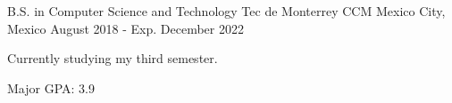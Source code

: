 

\begin{cventries}

  \cventry
    {B.S. in Computer Science and Technology} %
    {Tec de Monterrey CCM} %
    {Mexico City, Mexico} %
    {August 2018 - Exp. December 2022} %
    {
      \begin{cvitems} %
        \item {Currently studying my third semester.}
        \item {Major GPA: 3.9}
      \end{cvitems}
    }

\end{cventries}
